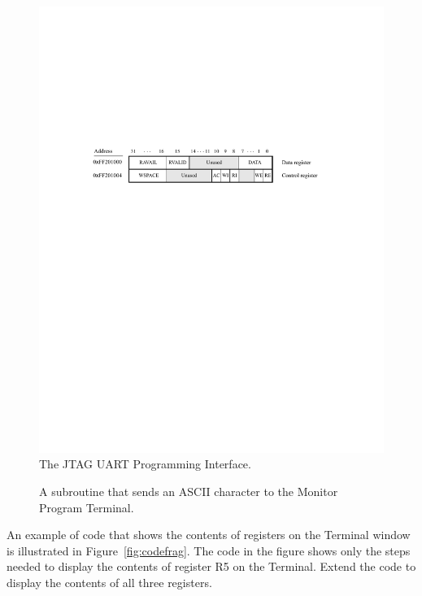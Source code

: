 \documentclass[epsfig,10pt,fullpage]{article}
\begin{document}
\begin{figure}[htb]
	\begin{center}
	\includegraphics[scale=1]{figures/figureJTAGUART.pdf}
	\end{center}
	\caption{The JTAG UART Programming Interface.}
\label{fig:UART}
\end{figure}

\begin{figure}[H]
\begin{center}
\begin{minipage}[t]{16.5 cm}

\end{minipage}
\end{center}
\caption{A subroutine that sends an ASCII character to the Monitor Program Terminal.}
\label{fig:jtag_out}
\end{figure}

\noindent
An example of code that shows the contents of registers on the Terminal window
is illustrated in Figure~\ref{fig:codefrag}. The code in the figure shows only the steps needed 
to display the contents of register R5 on the Terminal. Extend the code to display the contents of 
all three registers.
\end{document}
